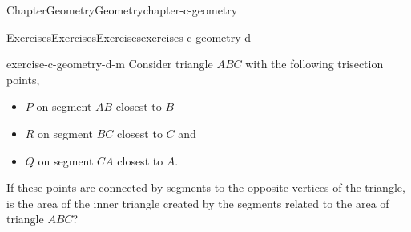 \documentclass[oneside,10pt,]{book}
\numberwithin{equation}{section}
\begin{document}
\begin{chapterptx}{Chapter}{Geometry}{}{Geometry}{}{}{chapter-c-geometry}
\begin{exercises-section}{Exercises}{Exercises}{}{Exercises}{}{}{exercises-c-geometry-d}
\begin{divisionexercise}{12}{}{}{exercise-c-geometry-d-m}%
Consider triangle \(ABC\) with the following trisection points,%
\begin{itemize}[label=\textbullet]
\item{}\(P\) on segment \(AB\) closest to \(B\)%
\item{}\(R\) on segment \(BC\) closest to \(C\) and%
\item{}\(Q\) on segment \(CA\) closest to \(A\).%
\end{itemize}
If these points are connected by segments to the opposite vertices of the triangle, is the area of the inner triangle created by the segments related to the area of triangle \(ABC\)?%
\end{divisionexercise}%
\end{exercises-section}
\end{chapterptx}
%
%
\typeout{************************************************}
\typeout{************************************************}
%
\end{document}
